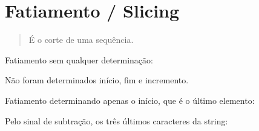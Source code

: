 \documentclass[letterpaper,10pt,brazil]{sphinxmanual}
\begin{document}
\begin{sphinxVerbatim}[commandchars=\\\{\}]
\end{sphinxVerbatim}


\section{Fatiamento / Slicing}
\label{\detokenize{content/sequences:fatiamento-slicing}}\begin{quote}

É o corte de uma sequência.

\end{quote}

Fatiamento sem qualquer determinação:

\begin{sphinxVerbatim}[commandchars=\\\{\}]
\PYG{p}{[}\PYG{p}{]}
\end{sphinxVerbatim}

\begin{sphinxVerbatim}[commandchars=\\\{\}]
\end{sphinxVerbatim}

Não foram determinados início, fim e incremento.

Fatiamento determinando apenas o início, que é o último elemento:

\begin{sphinxVerbatim}[commandchars=\\\{\}]
\PYG{p}{[}\PYG{p}{]}
\end{sphinxVerbatim}

\begin{sphinxVerbatim}[commandchars=\\\{\}]
\end{sphinxVerbatim}

Pelo sinal de subtração, os três últimos caracteres da string:

\begin{sphinxVerbatim}[commandchars=\\\{\}]
\PYG{p}{[}\PYG{p}{]}
\end{sphinxVerbatim}
\end{document}
